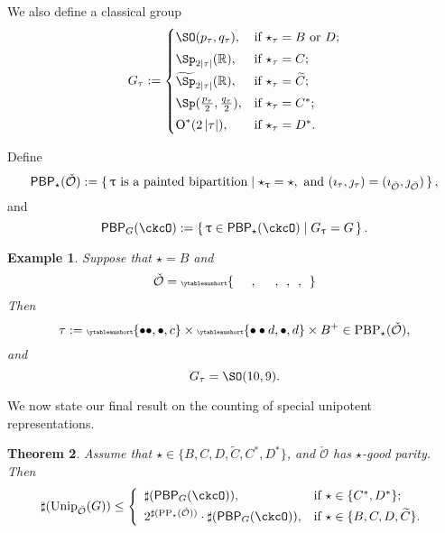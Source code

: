 \documentclass[12pt,a4paper]{amsart}
\let\ytb=\ytableaushort
\newcommand{\tytb}[1]{{\tiny\ytb{#1}}}
\def\abs#1{\left|{#1}\right|}
\newcommand{\CO}{{\mathcal {O}}}
\newcommand{\oO}{\operatorname{O}}
\newcommand{\R}{\mathbb R}
\numberwithin{equation}{section}
\newtheorem{thm}{Theorem}[section]
\newtheorem{eg}[thm]{Example}
\theoremstyle{remark}
\def\Unip{\mathrm{Unip}}
\def\CPPs{\mathrm{PP}_{\star}}
\def\PBP{\mathsf{PBP}}
\begin{document}
We also define a classical group
\begin{equation*}%
  G_\tau:=
  \begin{cases}
    \SO(p_\tau, q_\tau), &\hbox{if $\star_\tau=B$ or $D$}; \smallskip\\
    \Sp_{2\abs{\tau}}(\R), &\hbox{if $\star_\tau=C$}; \smallskip\\
    \widetilde{\Sp}_{2\abs{\tau}}(\R), &\hbox{if $\star_\tau=\widetilde{ C}$}; \smallskip \\
    \Sp(\frac{p_\tau}{2}, \frac{q_\tau}{2}), &\hbox{if $\star_\tau=C^*$}; \smallskip \\
    \oO^*(2\abs{\tau}), &\hbox{if $\star_\tau=D^*$}.\\
  \end{cases}
\end{equation*}


Define
\begin{equation}\label{defpbp2222}
  \PBP_\star(\check \CO) :=\set{ \uptau\textrm{ is a painted
      bipartition} \mid \star_\uptau = \star, \text{ and
    } (\imath_\tau,\jmath_\tau) = (\imath_{\check \CO}, \jmath_{\check \CO})},
\end{equation}
and
\begin{equation*} %
    \PBP_{G}(\ckcO) :=\set{\uptau\in \PBP_{\star}(\ckcO)| G_{\uptau} = G}.
\end{equation*}

\delete{
  \[
    \begin{array}{rl}
      \mathrm{PBP}_\star(\check \CO):=\{ &
                                           \tau\textrm{ is a painted bipartition}  \mid    \star_\tau = \star,
                                           \text{ and } \\  & (\imath_\tau,\jmath_\tau) = (\imath_{\check \CO}, \jmath_{\check \CO})\}.
    \end{array}
  \]
}


\begin{eg} Suppose that $\star=B$ and
  \[
    \check \CO =\tytb{\ \ \ \ \ \ , \ \ \ \ \ \ , \ \ , \ \ , \ \ }
  \]
  Then
  \[
    \tau:= \tytb{\bullet \bullet ,\bullet , c } \times \tytb{\bullet \bullet d ,\bullet , d }\times B^+\in \mathrm{PBP}_{\star}(\check \CO),
  \]
  and
  \[
    G_\tau=\SO(10,9).
  \]
\end{eg}


We now state our final result on the counting of special unipotent representations.


\begin{thm}\label{countup}
  Assume that $\star\in \{B, C,D,\widetilde {C}, C^*, D^*\}$, and $\check \CO$ has $\star$-good parity. Then
 \[
   \sharp(\Unip_{\check \CO}(G)) \leq
    \left\{
    \begin{array}{ll}
       \sharp (\PBP_{G}(\ckcO)),  & \hbox{if $\star\in \{C^*,D^*\}$}; \smallskip\\
       2^{\sharp(\CPPs(\check \CO))} \cdot \sharp (\PBP_{G}(\ckcO)),  &\hbox{if $\star\in \{B, C,D,\widetilde {C}\}$}.
    \end{array}
  \right.
  \]
\end{thm}
\end{document}
